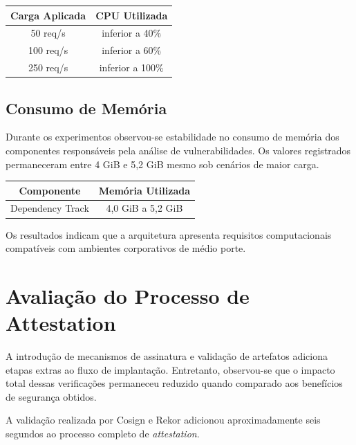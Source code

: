 \begin{table}[htbp]
\centering
{}
\label{tab:cpu}
\begin{tabular}{|c|c|}
\hline
\textbf{Carga Aplicada} & \textbf{CPU Utilizada} \\
\hline
50 req/s & inferior a 40\% \\
\hline
100 req/s & inferior a 60\% \\
\hline
250 req/s & inferior a 100\% \\
\hline
\end{tabular}
\end{table}

\subsection{Consumo de Memória}
\label{subsec:consumo-memoria}

Durante os experimentos observou-se estabilidade no consumo de memória dos componentes responsáveis pela análise de vulnerabilidades. Os valores registrados permaneceram entre 4 GiB e 5,2 GiB mesmo sob cenários de maior carga.

\begin{table}[htbp]
\centering
{}
\label{tab:memoria}
\begin{tabular}{|c|c|}
\hline
\textbf{Componente} & \textbf{Memória Utilizada} \\
\hline
Dependency Track & 4,0 GiB a 5,2 GiB \\
\hline
\end{tabular}
\end{table}

Os resultados indicam que a arquitetura apresenta requisitos computacionais compatíveis com ambientes corporativos de médio porte.

\section{Avaliação do Processo de Attestation}
\label{sec:avaliacao-attestation}

A introdução de mecanismos de assinatura e validação de artefatos adiciona etapas extras ao fluxo de implantação. Entretanto, observou-se que o impacto total dessas verificações permaneceu reduzido quando comparado aos benefícios de segurança obtidos.

A validação realizada por Cosign e Rekor adicionou aproximadamente seis segundos ao processo completo de \textit{attestation}.

